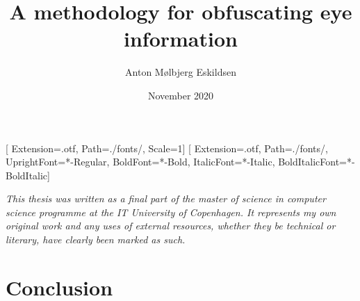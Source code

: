 \documentclass[11pt, a4paper, twoside]{report}
\title{A methodology for obfuscating eye information}
\author{Anton Mølbjerg Eskildsen}
\date{November 2020}
\begin{document}
[
Extension={.otf},
Path=./fonts/,
Scale=1]
\setmainfont{STIX2Text}[
Extension={.otf},
Path=./fonts/,
UprightFont={*-Regular},
BoldFont={*-Bold},
ItalicFont={*-Italic},
BoldItalicFont={*-BoldItalic}]

\maketitle

\tableofcontents

\newpage
\begin{center}
\emph{This thesis was written as a final part of the master of science in computer science programme at the IT University of Copenhagen. It represents my own original work and any uses of external resources, whether they be technical or literary, have clearly been marked as such.}
\end{center}
\newpage















\chapter{Conclusion}

\printbibliography

\newpage

\printnoidxglossaries
\printnomenclature[1in]

\newpage

\end{document}
